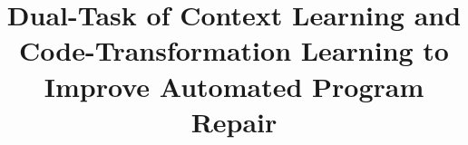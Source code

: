 \documentclass[10pt,conference]{IEEEtran}
\newcommand{\tool}{\textsc{CDFix}\xspace}
\begin{document}

\title{Dual-Task of Context Learning and Code-Transformation Learning to Improve Automated Program Repair}


\end{document}
